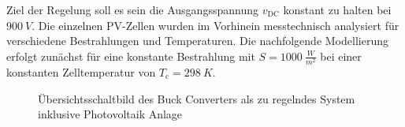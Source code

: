 Ziel der Regelung soll es sein die Ausgangsspannung $v_{\mathrm{DC}}$ konstant zu halten bei $\SI{900}{V}$. Die einzelnen PV-Zellen wurden im Vorhinein messtechnisch analysiert für verschiedene Bestrahlungen und Temperaturen. Die nachfolgende Modellierung erfolgt zunächst für eine konstante Bestrahlung mit $S = \SI{1000}{\frac{W}{m^2}}$ bei einer konstanten Zelltemperatur von $T_{\mathrm{c}} = \SI{298}{K}$.

\begin{figure}[H]
   \centering
   \caption[Skizze der Regelaufgabe]{Übersichtsschaltbild des Buck Converters als zu regelndes System inklusive Photovoltaik Anlage}
   \label{fig:Bild1}
\end{figure}

